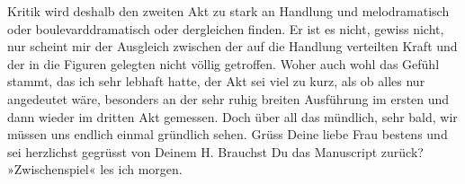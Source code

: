 \begin{ledgroupsized}[t]{13cm}
               Kritik wird deshalb den zweiten Akt zu stark an Handlung und melodramatisch oder
               boulevarddramatisch oder dergleichen finden. Er ist es nicht, gewiss nicht, nur
               scheint mir der Ausgleich zwischen der auf die Handlung verteilten Kraft und der in
               die Figuren gelegten nicht völlig getroffen. Woher auch wohl das Gefühl stammt, das
               ich sehr lebhaft hatte, der Akt sei viel zu kurz, als ob alles nur angedeutet wäre,
               besonders an der sehr ruhig breiten Ausführung im ersten und dann wieder im dritten
               Akt gemessen. Doch über all das mündlich, sehr bald, wir müssen uns endlich einmal
               gründlich sehen. Grüss Deine liebe Frau bestens und sei herzlichst gegrüsst von Deinem\pend
           \pstart \spacefill\mbox{H.}\pend{}\pstart
           \noindent{}Brauchst Du das Manuscript zurück? »Zwischenspiel« les ich morgen.\pend
           
         
         \endnumbering{}\end{ledgroupsized}  \newcommand{\dateiname}{L01548}\newcommand{\titel}{Hermann Bahr an Arthur Schnitzler, 17. 9. 1905}\newcommand{\editorInnen}{ Kurt Ifkovits,  Martin Anton Müller}
      